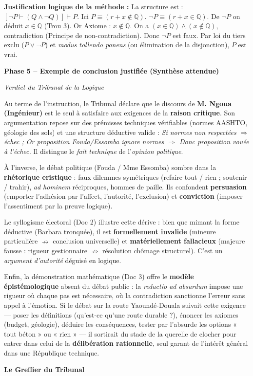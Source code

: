 \documentclass[11pt]{article}
\begin{document}
\begin{exoresolu}
\noindent\textbf{Justification logique de la méthode :}
La structure est : $[\neg P \vdash (Q \land \neg Q)] \vdash P$.
Ici $P \equiv (r+x \notin \mathbb{Q})$. $\neg P \equiv (r+x \in \mathbb{Q})$.
De $\neg P$ on déduit $x \in \mathbb{Q}$ (Trou 3). Or Axiome : $x \notin \mathbb{Q}$.
On a $(x \in \mathbb{Q}) \land (x \notin \mathbb{Q})$, contradiction (Principe de non-contradiction).
Donc $\neg P$ est faux. Par loi du tiers exclu ($P \lor \neg P$) et \emph{modus tollendo ponens} (ou élimination de la disjonction), $P$ est vrai.

\medskip
\noindent\textbf{Phase 5 -- Exemple de conclusion justifiée (Synthèse attendue)}

\emph{Verdict du Tribunal de la Logique}

Au terme de l'instruction, le Tribunal déclare que le discours de \textbf{M. Ngoua (Ingénieur)} est le seul à satisfaire aux exigences de la \textbf{raison critique}. Son argumentation repose sur des prémisses techniques vérifiables (normes AASHTO, géologie des sols) et une structure déductive valide : \emph{Si normes non respectées $\Rightarrow$ échec ; Or proposition Fouda/Essomba ignore normes $\Rightarrow$ Donc proposition vouée à l'échec.} Il distingue le \emph{fait technique} de l'\emph{opinion politique}.

À l'inverse, le débat politique (Fouda / Mme Essomba) sombre dans la \textbf{rhétorique eristique} : faux dilemmes symétriques (refaire tout / rien ; soutenir / trahir), \emph{ad hominem} réciproques, hommes de paille. Ils confondent \textbf{persuasion} (emporter l'adhésion par l'affect, l'autorité, l'exclusion) et \textbf{conviction} (imposer l'assentiment par la preuve logique).

Le syllogisme électoral (Doc 2) illustre cette dérive : bien que mimant la forme déductive (Barbara tronquée), il est \textbf{formellement invalide} (mineure particulière $\nrightarrow$ conclusion universelle) et \textbf{matériellement fallacieux} (majeure fausse : rigueur gestionnaire $\not\Rightarrow$ résolution chômage structurel). C'est un \emph{argument d'autorité} déguisé en logique.

Enfin, la démonstration mathématique (Doc 3) offre le \textbf{modèle épistémologique} absent du débat public : la \emph{reductio ad absurdum} impose une rigueur où chaque pas est nécessaire, où la contradiction sanctionne l'erreur sans appel à l'émotion. Si le débat sur la route Yaoundé-Douala suivait cette exigence — poser les définitions (qu'est-ce qu'une route durable ?), énoncer les axiomes (budget, géologie), déduire les conséquences, tester par l'absurde les options « tout béton » ou « rien » — il sortirait du stade de la querelle de clocher pour entrer dans celui de la \textbf{délibération rationnelle}, seul garant de l'intérêt général dans une République technique.

\hfill \textbf{Le Greffier du Tribunal}
\end{exoresolu}
\end{document}
